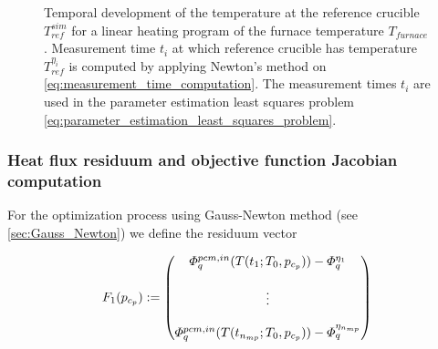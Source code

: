 \documentclass{scrartcl}[12pt, halfparskip]
\numberwithin{equation}{section}
\numberwithin{figure}{section}
\numberwithin{table}{section}
\begin{document}
\begin{figure}[H]
	\centering
	\caption{Temporal development of the temperature at the reference crucible $T_{ref}^{sim}$ for a linear heating program of the furnace temperature $T_{furnace}$. Measurement time $t_i$ at which reference crucible has temperature $T_{ref}^{\eta_i}$ is computed by applying Newton's method on \cref{eq:measurement_time_computation}. The measurement times $t_i$ are used in the parameter estimation least squares problem \cref{eq:parameter_estimation_least_squares_problem}.}
	\label{fig:obtaining_measurement_times}
\end{figure}

\subsubsection{Heat flux residuum and objective function Jacobian computation}

For the optimization process using Gauss-Newton method (see \cref{sec:Gauss_Newton}) we define the residuum vector 

\begin{equation}
	F_1(p_{c_p}) :=
	\begin{pmatrix}
		\varPhi_{q}^{pcm,in}(T(t_1;T_0,p_{c_p})) - \varPhi_q^{\eta_1} \\
		\textcolor{white}{} \\
		\vdots \\
		\textcolor{white}{} \\
		\varPhi_{q}^{pcm,in}(T(t_{n_{mp}};T_0,p_{c_p})) - \varPhi_q^{\eta_{n_{mp}}}
	\end{pmatrix}
\end{equation}
\end{document}
